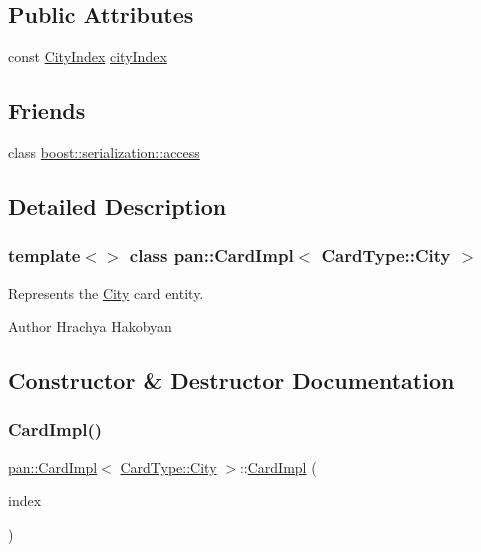 \subsection*{Public Attributes}
\begin{DoxyCompactItemize}
\item 
const \hyperlink{namespacepan_afaed28aa6603153dcc062a028602d697}{City\+Index} \hyperlink{classpan_1_1_card_impl_3_01_card_type_1_1_city_01_4_a793e709dc8efad7f513a1b92079ac09b}{city\+Index}
\end{DoxyCompactItemize}
\subsection*{Friends}
\begin{DoxyCompactItemize}
\item 
class \hyperlink{classpan_1_1_card_impl_3_01_card_type_1_1_city_01_4_ac98d07dd8f7b70e16ccb9a01abf56b9c}{boost\+::serialization\+::access}
\end{DoxyCompactItemize}


\subsection{Detailed Description}
\subsubsection*{template$<$$>$\newline
class pan\+::\+Card\+Impl$<$ Card\+Type\+::\+City $>$}

Represents the \hyperlink{classpan_1_1_city}{City} card entity. 

\begin{DoxyAuthor}{Author}
Hrachya Hakobyan 
\end{DoxyAuthor}


\subsection{Constructor \& Destructor Documentation}
\mbox{\label{classpan_1_1_card_impl_3_01_card_type_1_1_city_01_4_a9377dcb4087c82ccb0f021e0a675e9e3}} 
\subsubsection{\texorpdfstring{Card\+Impl()}{CardImpl()}}
{\footnotesize\ttfamily \hyperlink{classpan_1_1_card_impl}{pan\+::\+Card\+Impl}$<$ \hyperlink{namespacepan_a1f7350bfd0421afeabe9fa95c16fa811a57d056ed0984166336b7879c2af3657f}{Card\+Type\+::\+City} $>$\+::\hyperlink{classpan_1_1_card_impl}{Card\+Impl} (\begin{DoxyParamCaption}\item[{\hyperlink{namespacepan_afaed28aa6603153dcc062a028602d697}{City\+Index}}]{index }\end{DoxyParamCaption})}

